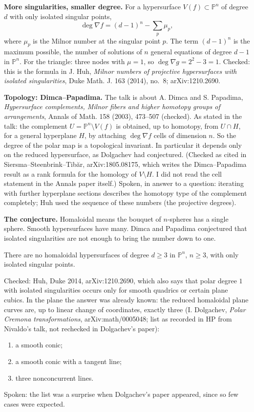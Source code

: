 \medskip\noindent
{\bf More singularities, smaller degree.}
For a hypersurface $V(f) \subset
\mathbb{P}^n$ of degree $d$ with only
isolated singular points,
$$
\deg \nabla f
= (d-1)^n - \sum_{p} \mu_p,
$$
where $\mu_p$ is the Milnor number at the
singular point $p$. The term $(d-1)^n$ is
the maximum possible, the number of
solutions of $n$ general equations of degree
$d-1$ in $\mathbb{P}^n$. For the triangle:
three nodes with $\mu = 1$, so
$\deg \nabla g = 2^2 - 3 = 1$. Checked: this
is the formula in J. Huh, \emph{Milnor
numbers of projective hypersurfaces with
isolated singularities}, Duke Math. J. 163
(2014), no.~8; arXiv:1210.2690.

\medskip\noindent
{\bf Topology: Dimca--Papadima.} The talk is
about A. Dimca and S. Papadima,
\emph{Hypersurface complements, Milnor
fibers and higher homotopy groups of
arrangements}, Annals of Math. 158 (2003),
473--507 (checked). As stated in the talk:
the complement $U = \mathbb{P}^n \setminus
V(f)$ is obtained, up to homotopy, from
$U \cap H$, for a general hyperplane $H$, by
attaching $\deg \nabla f$ cells of dimension
$n$. So the degree of the polar map is a
topological invariant. In particular it
depends only on the reduced hypersurface, as
Dolgachev had conjectured. (Checked as cited
in Siersma--Steenbrink--Tib\u{a}r,
arXiv:1805.08175, which writes the
Dimca--Papadima result as a rank formula for
the homology of $V \setminus H$. I did not
read the cell statement in the Annals paper
itself.) Spoken, in answer to a question:
iterating with further hyperplane sections
describes the homotopy type of the
complement completely; Huh used the sequence
of these numbers (the projective degrees).

\medskip\noindent
{\bf The conjecture.} Homaloidal means the
bouquet of $n$-spheres has a single sphere.
Smooth hypersurfaces have many. Dimca and
Papadima conjectured that isolated
singularities are not enough to bring the
number down to one.

\begin{theorem}
\label{theorem-huh-dimca-papadima}
There are no homaloidal hypersurfaces of
degree $d \ge 3$ in $\mathbb{P}^n$,
$n \ge 3$, with only isolated singular
points.
\end{theorem}

\noindent
Checked: Huh, Duke 2014, arXiv:1210.2690,
which also says that polar degree $1$ with
isolated singularities occurs only for
smooth quadrics or certain plane cubics. In
the plane the answer was already known: the
reduced homaloidal plane curves are, up to
linear change of coordinates, exactly three
(I. Dolgachev, \emph{Polar Cremona
transformations}, arXiv:math/0005048; list as
recorded in HP from Nivaldo's talk, not
rechecked in Dolgachev's paper):
\begin{enumerate}
\item a smooth conic;
\item a smooth conic with a tangent line;
\item three nonconcurrent lines.
\end{enumerate}
Spoken: the list was a surprise when
Dolgachev's paper appeared, since so few
cases were expected.

